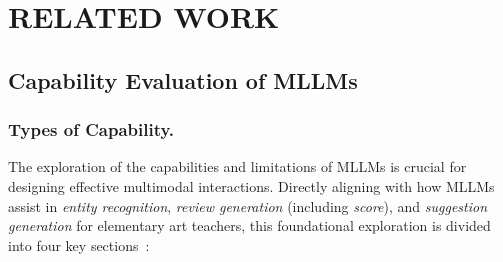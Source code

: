 \section{RELATED WORK}
\subsection{Capability Evaluation of MLLMs}
\subsubsection{Types of Capability.}
The exploration of the capabilities and limitations of MLLMs is crucial for designing effective multimodal interactions. Directly aligning with how MLLMs assist in \textit{entity recognition}, \textit{review generation} (including \textit{score}), and \textit{suggestion generation} for elementary art teachers, this foundational exploration is divided into four key sections~\cite{huang2024survey}:
